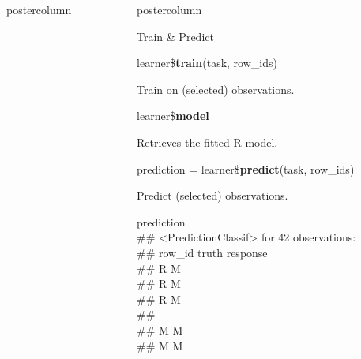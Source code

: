 \documentclass{beamer}
\newlength{\columnheight} %
\begin{document}
\begin{frame}[fragile]{}
\begin{columns}
\begin{column}{.245\textwidth}
\begin{beamercolorbox}[center]{postercolumn}
			\end{beamercolorbox}
		\end{column}
		\begin{column}{.245\textwidth}
			\begin{beamercolorbox}[center]{postercolumn}
				\begin{minipage}{.98\textwidth}
					\parbox[t][\columnheight]{\textwidth}{
						\begin{myblock}{Train \& Predict}
						\begin{codebox}
							learner\$\textbf{train}(task, row\_ids)
						\end{codebox}
                        Train on (selected) observations. 
						\\
						\begin{codebox}
							learner\$\textbf{model}
						\end{codebox}
						Retrieves the fitted R model.
						\\
						\vspace{1em} %
						\begin{codebox}
							prediction = learner\$\textbf{predict}(task, row\_ids)
						\end{codebox}
                        Predict (selected) observations.
                        \\
                        \begin{codeboxmultiline}[width=23cm]
							{\footnotesize prediction\\
							\#\# <PredictionClassif> for 42 observations:\\
							\#\# row\_id truth response\\
							\#\# \space\space\space\space\space 2
							\space\space\space\space R \space\space\space\space\space\space\space M\\
							\#\# \space\space\space\space\space 3
							\space\space\space\space R \space\space\space\space\space\space\space M\\
							\#\# \space\space\space\space\space 5
							\space\space\space\space R \space\space\space\space\space\space\space M\\
							\#\# - - -\\
							\#\# \space\space\space 198
							\space\space\space\space M \space\space\space\space\space\space\space M\\
							\#\# \space\space{}00
							\space\space\space\space M \space\space\space\space\space\space\space M\\
}
\end{codeboxmultiline}
\end{myblock}}
\end{minipage}
\end{beamercolorbox}
\end{column}
\end{columns}
\end{frame}
\end{document}
